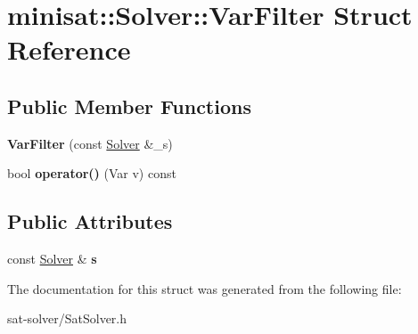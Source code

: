 \hypertarget{structminisat_1_1Solver_1_1VarFilter}{\section{minisat\-:\-:\-Solver\-:\-:\-Var\-Filter \-Struct \-Reference}
\label{structminisat_1_1Solver_1_1VarFilter}
}
\subsection*{\-Public \-Member \-Functions}
\begin{DoxyCompactItemize}
\item 
\hypertarget{structminisat_1_1Solver_1_1VarFilter_a0b72bff35c362ec82d71a1f413e2ed6a}{{\bfseries \-Var\-Filter} (const \hyperlink{classminisat_1_1Solver}{\-Solver} \&\-\_\-s)}\label{structminisat_1_1Solver_1_1VarFilter_a0b72bff35c362ec82d71a1f413e2ed6a}

\item 
\hypertarget{structminisat_1_1Solver_1_1VarFilter_ad53511032c17b02381d2e77c0cb9458a}{bool {\bfseries operator()} (\-Var v) const }\label{structminisat_1_1Solver_1_1VarFilter_ad53511032c17b02381d2e77c0cb9458a}

\end{DoxyCompactItemize}
\subsection*{\-Public \-Attributes}
\begin{DoxyCompactItemize}
\item 
\hypertarget{structminisat_1_1Solver_1_1VarFilter_ab967e27017d00767752f72b3635c2f17}{const \hyperlink{classminisat_1_1Solver}{\-Solver} \& {\bfseries s}}\label{structminisat_1_1Solver_1_1VarFilter_ab967e27017d00767752f72b3635c2f17}

\end{DoxyCompactItemize}


\-The documentation for this struct was generated from the following file\-:\begin{DoxyCompactItemize}
\item 
sat-\/solver/\-Sat\-Solver.\-h\end{DoxyCompactItemize}
